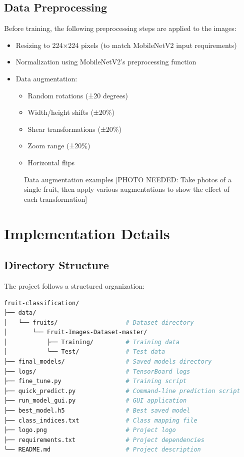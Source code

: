 \documentclass[11pt,a4paper]{report}
\begin{document}
\section{Data Preprocessing}
Before training, the following preprocessing steps are applied to the images:

\begin{itemize}
    \item Resizing to 224×224 pixels (to match MobileNetV2 input requirements)
    \item Normalization using MobileNetV2's preprocessing function
    \item Data augmentation:
    \begin{itemize}
        \item Random rotations (±20 degrees)
        \item Width/height shifts (±20\%)
        \item Shear transformations (±20\%)
        \item Zoom range (±20\%)
        \item Horizontal flips
    \end{itemize}
\end{itemize}

\begin{figure}[H]
    \centering
    \fbox{\rule{0pt}{10cm}\rule{12cm}{0pt}}
    \caption{Data augmentation examples [PHOTO NEEDED: Take photos of a single fruit, then apply various augmentations to show the effect of each transformation]}
    \label{fig:data_augmentation}
\end{figure}

\chapter{Implementation Details}

\section{Directory Structure}
The project follows a structured organization:

\begin{lstlisting}[language=bash, caption=Project directory structure]
fruit-classification/
├── data/
│   └── fruits/                   # Dataset directory
│       └── Fruit-Images-Dataset-master/
│           ├── Training/         # Training data
│           └── Test/             # Test data
├── final_models/                 # Saved models directory
├── logs/                         # TensorBoard logs
├── fine_tune.py                  # Training script
├── quick_predict.py              # Command-line prediction script
├── run_model_gui.py              # GUI application
├── best_model.h5                 # Best saved model
├── class_indices.txt             # Class mapping file
├── logo.png                      # Project logo
├── requirements.txt              # Project dependencies
└── README.md                     # Project description
\end{lstlisting}
\end{document}
